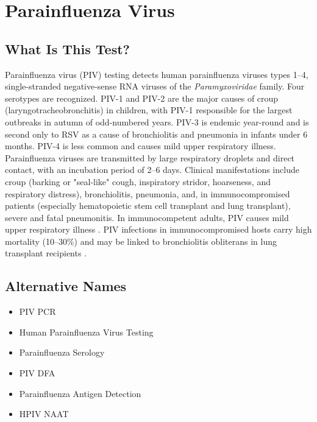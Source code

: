 \chapter{Parainfluenza Virus}

\section*{What Is This Test?}
Parainfluenza virus (PIV) testing detects human parainfluenza viruses types 1--4, single-stranded negative-sense RNA viruses of the \textit{Paramyxoviridae} family. Four serotypes are recognized. PIV-1 and PIV-2 are the major causes of croup (laryngotracheobronchitis) in children, with PIV-1 responsible for the largest outbreaks in autumn of odd-numbered years. PIV-3 is endemic year-round and is second only to RSV as a cause of bronchiolitis and pneumonia in infants under 6 months. PIV-4 is less common and causes mild upper respiratory illness. Parainfluenza viruses are transmitted by large respiratory droplets and direct contact, with an incubation period of 2--6 days. Clinical manifestations include croup (barking or "seal-like" cough, inspiratory stridor, hoarseness, and respiratory distress), bronchiolitis, pneumonia, and, in immunocompromised patients (especially hematopoietic stem cell transplant and lung transplant), severe and fatal pneumonitis. In immunocompetent adults, PIV causes mild upper respiratory illness \cite{hall2001respiratory}. PIV infections in immunocompromised hosts carry high mortality (10--30\%) and may be linked to bronchiolitis obliterans in lung transplant recipients \cite{chemaly2012characteristics}.

\section*{Alternative Names}
\begin{itemize}
  \item PIV PCR
  \item Human Parainfluenza Virus Testing
  \item Parainfluenza Serology
  \item PIV DFA
  \item Parainfluenza Antigen Detection
  \item HPIV NAAT
\end{itemize}
